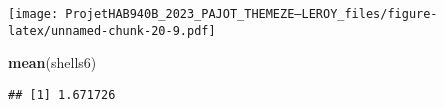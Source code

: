 \documentclass[
]{article}
\newenvironment{Shaded}{\begin{snugshade}}{\end{snugshade}}
\newcommand{\CommentTok}[1]{\textcolor[rgb]{0.56,0.35,0.01}{\textit{#1}}}
\newcommand{\FunctionTok}[1]{\textcolor[rgb]{0.13,0.29,0.53}{\textbf{#1}}}
\newcommand{\NormalTok}[1]{#1}
\newcommand{\OtherTok}[1]{\textcolor[rgb]{0.56,0.35,0.01}{#1}}
\newcommand{\SpecialCharTok}[1]{\textcolor[rgb]{0.81,0.36,0.00}{\textbf{#1}}}
\begin{document}
\texttt{[image: ProjetHAB940B\_2023\_PAJOT\_THEMEZE--LEROY\_files/figure-latex/unnamed-chunk-20-9.pdf]}

\begin{Shaded}
\begin{Highlighting}[]
\FunctionTok{mean}\NormalTok{(shells6)}
\end{Highlighting}
\end{Shaded}

\begin{verbatim}
## [1] 1.671726
\end{verbatim}

\begin{Shaded}
\end{Shaded}
\end{document}
